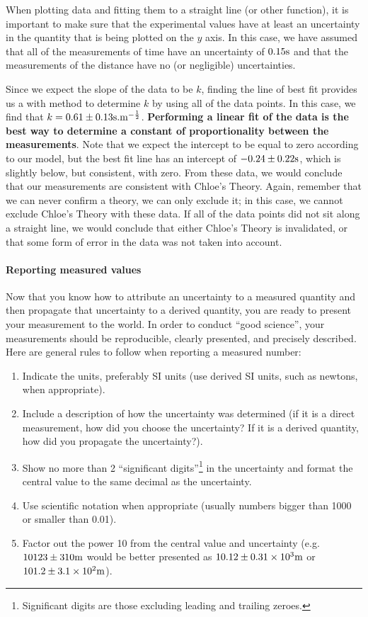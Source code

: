 When plotting data and fitting them to a straight line (or other function), it is important to make sure that the experimental values have at least an uncertainty in the quantity that is being plotted on the $y$ axis. In this case, we have assumed that all of the measurements of time have an uncertainty of $0.15 {\rm s}$ and that the measurements of the distance have no (or negligible) uncertainties.

Since we expect the slope of the data to be $k$, finding the line of best fit provides us a with method to determine $k$ by using all of the data points. In this case, we find that $k=0.61\pm 0.13 {\rm s.m^{ -\frac{1}{2}}}$. \textbf{Performing a linear fit of the data is the best way to determine a constant of proportionality between the measurements}. Note that we expect the intercept to be equal to zero according to our model, but the best fit line has an intercept of $-0.24\pm 0.22 {\rm s}$, which is slightly below, but consistent, with zero. From these data, we would conclude that our measurements are consistent with Chloe's Theory. Again, remember that we can never confirm a theory, we can only exclude it; in this case, we cannot exclude Chloe's Theory with these data. If all of the data points did not sit along a straight line, we would conclude that either Chloe's Theory is invalidated, or that some form of error in the data was not taken into account.

\paragraph{Reporting measured values}

Now that you know how to attribute an uncertainty to a measured quantity and then propagate that uncertainty to a derived quantity, you are ready to present your measurement to the world. In order to conduct ``good science'', your measurements should be reproducible, clearly presented, and precisely described. Here are general rules to follow when reporting a measured number:

\begin{enumerate}
\item Indicate the units, preferably SI units (use derived SI units, such as newtons, when appropriate).
\item Include a description of how the uncertainty was determined (if it is a direct measurement, how did you choose the uncertainty? If it is a derived quantity, how did you propagate the uncertainty?).
\item Show no more than 2 ``significant digits''\footnote{Significant digits are those excluding leading and trailing zeroes.} in the uncertainty and format the central value to the same decimal as the uncertainty.
\item Use scientific notation when appropriate (usually numbers bigger than 1000 or smaller than 0.01).
\item Factor out the power 10 from the central value and uncertainty (e.g. $10123\pm 310 {\rm m}$ would be better presented as $10.12\pm 0.31 \times 10^3 {\rm m}$ or $101.2\pm 3.1 \times 10^2 {\rm m}$).
\end{enumerate}

